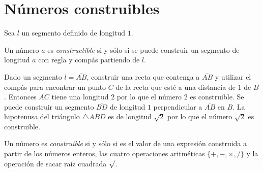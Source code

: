 \section{Números construibles}\label{s.trisect-constructible}

Sea $l$ un segmento definido de longitud $1$.
\begin{definition}
Un número $a$ es \emph{constructible} si y sólo si se puede construir un segmento de longitud $a$ con regla y compás partiendo de $l$.
\end{definition}

Dado un segmento $l=\overline{AB}$, construir una recta que contenga a $\overline{AB}$ y utilizar el compás para encontrar un punto $C$ de la recta que esté a una distancia de $1$ de $B$. Entonces $\overline{AC}$ tiene una longitud $2$ por lo que el número $2$ es construible. Se puede construir un segmento $\overline{BD}$ de longitud $1$ perpendicular a $\overline{AB}$ en $B$. La hipotenusa del triángulo $\triangle ABD$ es de longitud $\sqrt{2}$ por lo que el número $\sqrt{2}$ es construible.



\begin{theorem}\label{thm.trisect-constructible}
Un número es \emph{construible} si y sólo si es el valor de una expresión construida a partir de los números enteros, las cuatro operaciones aritméticas $\{+,-,\times,/\}$ y la operación de sacar raíz cuadrada $\surd$.
\end{theorem}

